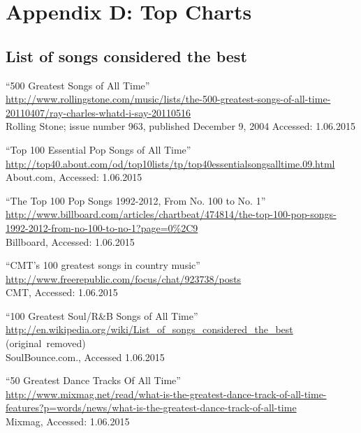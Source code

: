 
\chapter{Appendix D: Top Charts} %

\label{AppendixD} %


\section{List of songs considered the best}
\label{sec:topcharts}

``500 Greatest Songs of All Time'' \\
\url{http://www.rollingstone.com/music/lists/the-500-greatest-songs-of-all-time-20110407/ray-charles-whatd-i-say-20110516} \\
Rolling Stone; issue number 963, published December 9, 2004 Accessed: 1.06.2015

``Top 100 Essential Pop Songs of All Time'' \\
\url{http://top40.about.com/od/top10lists/tp/top40essentialsongsalltime.09.html} \\
 About.com, Accessed: 1.06.2015

``The Top 100 Pop Songs 1992-2012, From No. 100 to No. 1'' \\
\url{http://www.billboard.com/articles/chartbeat/474814/the-top-100-pop-songs-1992-2012-from-no-100-to-no-1?page=0%2C9} \\
Billboard, Accessed: 1.06.2015

``CMT's 100 greatest songs in country music'' \\
\url{http://www.freerepublic.com/focus/chat/923738/posts} \\
CMT, Accessed: 1.06.2015

``100 Greatest Soul/R\&B Songs of All Time'' \\
\url{http://en.wikipedia.org/wiki/List_of_songs_considered_the_best} (original~removed) \\
SoulBounce.com., Accessed 1.06.2015

``50 Greatest Dance Tracks Of All Time'' \\
\url{http://www.mixmag.net/read/what-is-the-greatest-dance-track-of-all-time-features?p=words/news/what-is-the-greatest-dance-track-of-all-time} \\
Mixmag, Accessed: 1.06.2015

